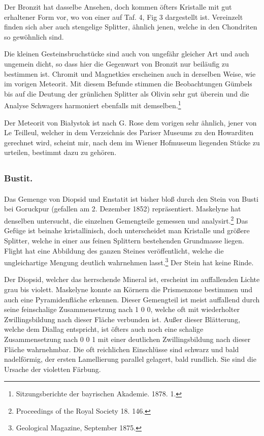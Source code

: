 \documentclass[a4paper, 11pt, oneside, polutonikogreek, german]{article}
\begin{document}
Der Bronzit hat dasselbe Ansehen, doch kommen öfters Kristalle mit gut erhaltener Form vor, wo von einer auf Taf. 4, Fig 3 dargestellt ist. Vereinzelt finden sich aber auch stengelige Splitter, ähnlich jenen, welche in den Chondriten so gewöhnlich sind.

Die kleinen Gesteinsbruchstücke sind auch von ungefähr gleicher Art und auch ungemein dicht, so dass hier die Gegenwart von Bronzit nur beiläufig zu bestimmen ist. Chromit und Magnetkies erscheinen auch in derselben Weise, wie im vorigen Meteorit. Mit diesem Befunde stimmen die Beobachtungen Gümbels bis auf die Deutung der grünlichen Splitter als Olivin sehr gut überein und die Analyse Schwagers harmoniert ebenfalls mit demselben.\footnote{Sitzungsberichte der bayrischen Akademie. 1878. 1.}

Der Meteorit von Białystok ist nach G. Rose dem vorigen sehr ähnlich, jener von Le Teilleul, welcher in dem Verzeichnis des Pariser Museums zu den Howarditen gerechnet wird, scheint mir, nach dem im Wiener Hofmuseum liegenden Stücke zu urteilen, bestimmt dazu zu gehören.
\clearpage
\subsection{}
\subsubsection{Bustit.}
\paragraph{}
Das Gemenge von Diopsid und Enstatit ist bisher bloß durch den Stein von Busti bei Goruckpur (gefallen am 2. Dezember 1852) repräsentiert. Maskelyne hat denselben untersucht, die einzelnen Gemengteile gemessen und analysirt.\footnote{Proceedings of the Royal Society 18. 146.} Das Gefüge ist beinahe kristallinisch, doch unterscheidet man Kristalle und größere Splitter, welche in einer aus feinen Splittern bestehenden Grundmasse liegen. Flight hat eine Abbildung des ganzen Steines veröffentlicht, welche die ungleichartige Mengung deutlich wahrnehmen lasst.\footnote{Geological Magazine, September 1875.} Der Stein hat keine Rinde.

Der Diopsid, welcher das herrschende Mineral ist, erscheint im auffallenden Lichte grau bis violett. Maskelyne konnte an Körnern die Prismenzone bestimmen und auch eine Pyramidenfläche erkennen. Dieser Gemengteil ist meist auffallend durch seine feinschalige Zusammensetzung nach 1 0 0, welche oft mit wiederholter Zwillingsbildung nach dieser Fläche verbunden ist. Außer dieser Blätterung, welche dem Diallag entspricht, ist öfters auch noch eine schalige Zusammensetzung nach 0 0 1 mit einer deutlichen Zwillingsbildung nach dieser Fläche wahrnehmbar. Die oft reichlichen Einschlüsse sind schwarz und bald nadelförmig, der ersten Lamellierung parallel gelagert, bald rundlich. Sie sind die Ursache der violetten Färbung.
\end{document}
